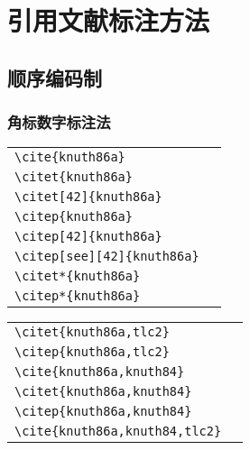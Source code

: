 
\chapter{引用文献标注方法}

\section{顺序编码制}

\subsection{角标数字标注法}

\noindent
\begin{tabular}{l@{\quad$\Rightarrow$\quad}l}
  \verb|\cite{knuth86a}|              & \cite{knuth86a}              \\
  \verb|\citet{knuth86a}|             & \citet{knuth86a}             \\
  \verb|\citet[42]{knuth86a}|         & \citet[42]{knuth86a}         \\
  \verb|\citep{knuth86a}|             & \citep{knuth86a}             \\
  \verb|\citep[42]{knuth86a}|         & \citep[42]{knuth86a}         \\
  \verb|\citep[see][42]{knuth86a}|    & \citep[see][42]{knuth86a}    \\
  \verb|\citet*{knuth86a}|            & \citet*{knuth86a}            \\
  \verb|\citep*{knuth86a}|            & \citep*{knuth86a}            \\
\end{tabular}
\par{}
\noindent
\begin{tabular}{l@{\quad$\Rightarrow$\quad}l}
  \verb|\citet{knuth86a,tlc2}|        & \citet{knuth86a,tlc2}        \\
  \verb|\citep{knuth86a,tlc2}|        & \citep{knuth86a,tlc2}        \\
  \verb|\cite{knuth86a,knuth84}|      & \cite{knuth86a,knuth84}      \\
  \verb|\citet{knuth86a,knuth84}|     & \citet{knuth86a,knuth84}     \\
  \verb|\citep{knuth86a,knuth84}|     & \citep{knuth86a,knuth84}     \\
  \verb|\cite{knuth86a,knuth84,tlc2}| & \cite{knuth86a,knuth84,tlc2} \\
\end{tabular}



